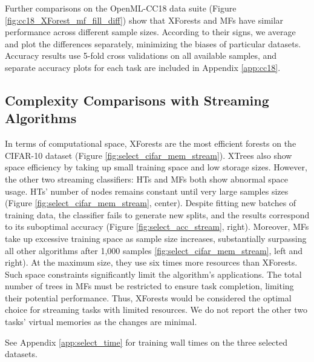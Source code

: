 Further comparisons on the OpenML-CC18 data suite (Figure \ref{fig:cc18_XForest_mf_fill_diff}) show that XForests and MFs have similar performance across different sample sizes. According to their signs, we average and plot the differences separately, minimizing the biases of particular datasets. Accuracy results use 5-fold cross validations on all available samples, and separate accuracy plots for each task are included in Appendix \ref{app:cc18}.

\subsection{Complexity Comparisons with Streaming Algorithms}
In terms of computational space, XForests are the most efficient forests on the CIFAR-10 dataset (Figure \ref{fig:select_cifar_mem_stream}). 
XTrees also show space efficiency by taking up small training space and low storage sizes.
However, the other two streaming classifiers: HTs and MFs both show abnormal space usage.
HTs' number of nodes remains constant until very large samples sizes (Figure \ref{fig:select_cifar_mem_stream}, center). Despite fitting new batches of training data, the classifier fails to generate new splits, and the results correspond to its suboptimal accuracy (Figure \ref{fig:select_acc_stream}, right).
Moreover, MFs take up excessive training space as sample size increases, substantially surpassing all other algorithms after 1,000 samples \ref{fig:select_cifar_mem_stream}, left and right). At the maximum size, they use six times more resources than XForests.
Such space constraints significantly limit the algorithm's applications. The total number of trees in MFs must be restricted to ensure task completion, limiting their potential performance. 
Thus, XForests would be considered the optimal choice for streaming tasks with limited resources. We do not report the other two tasks' virtual memories as the changes are minimal. 

See Appendix \ref{app:select_time} for training wall times on the three selected datasets.


